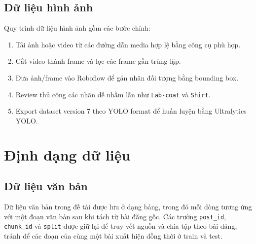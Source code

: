 \subsection{Dữ liệu hình ảnh}
Quy trình dữ liệu hình ảnh gồm các bước chính:
\begin{enumerate}
    \item Tải ảnh hoặc video từ các đường dẫn media hợp lệ bằng công cụ phù hợp.
    \item Cắt video thành frame và lọc các frame gần trùng lặp.
    \item Đưa ảnh/frame vào Roboflow để gán nhãn đối tượng bằng bounding box.
    \item Review thủ công các nhãn dễ nhầm lẫn như \texttt{Lab-coat} và \texttt{Shirt}.
    \item Export dataset version 7 theo YOLO format để huấn luyện bằng Ultralytics YOLO.
\end{enumerate}

\section{Định dạng dữ liệu}
\subsection{Dữ liệu văn bản}
Dữ liệu văn bản trong đề tài được lưu ở dạng bảng, trong đó mỗi dòng tương ứng với một đoạn văn bản sau khi tách từ bài đăng gốc. Các trường \texttt{post\_id}, \texttt{chunk\_id} và \texttt{split} được giữ lại để truy vết nguồn và chia tập theo bài đăng, tránh để các đoạn của cùng một bài xuất hiện đồng thời ở train và test.

